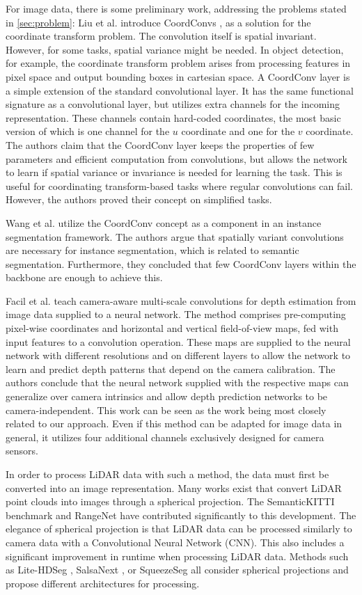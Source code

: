 For image data, there is some preliminary work, addressing the problems stated in \autoref{sec:problem}:
Liu et al. introduce CoordConvs \cite{CoordConvs}, as a solution for the coordinate transform problem.
The convolution itself is spatial invariant. However, for some tasks, spatial variance might be needed. In object detection, for example, the coordinate transform problem arises from processing features in pixel space and output bounding boxes in cartesian space. 
A CoordConv layer is a simple extension of the standard convolutional layer. It has the same functional signature as a convolutional layer, but utilizes extra channels for the incoming representation. These channels contain hard-coded coordinates, the most basic version of which is one channel for the $u$ coordinate and one for the $v$ coordinate. The authors claim that the CoordConv layer keeps the properties of few parameters and efficient computation from convolutions, but allows the network to learn if spatial variance or invariance is needed for learning the task. This is useful for coordinating transform-based tasks where regular convolutions can fail. However, the authors proved their concept on simplified tasks.

Wang et al. \cite{wang2021solo}\cite{wang2020solov2} utilize the CoordConv concept as a component in an instance segmentation framework. The authors argue that spatially variant convolutions are necessary for instance segmentation, which is related to semantic segmentation. Furthermore, they concluded that few CoordConv layers within the backbone are enough to achieve this.

Facil et al. teach camera-aware multi-scale convolutions for depth estimation from image data \cite{CamConv} supplied to a neural network. The method comprises pre-computing pixel-wise coordinates and horizontal and vertical field-of-view maps, fed with input features to a convolution operation. These maps are supplied to the neural network with different resolutions and on different layers to allow the network to learn and predict depth patterns that depend on the camera calibration. The authors conclude that the neural network supplied with the respective maps can generalize over camera intrinsics and allow depth prediction networks to be camera-independent.
This work can be seen as the work being most closely related to our approach. Even if this method can be adapted for image data in general, it utilizes four additional channels exclusively designed for camera sensors.

In order to process LiDAR data with such a method, the data must first be converted into an image representation.
Many works exist that convert LiDAR point clouds into images through a spherical projection. The SemanticKITTI benchmark \cite{behley2019iccv} and RangeNet \cite{8967762} have contributed significantly to this development. The elegance of spherical projection is that LiDAR data can be processed similarly to camera data with a Convolutional Neural Network (CNN). This also includes a significant improvement in runtime when processing LiDAR data. Methods such as Lite-HDSeg \cite{litehdseg}, SalsaNext \cite{SalsaNet}, or SqueezeSeg \cite{SqueezeSegV2} all consider spherical projections and propose different architectures for processing.  

